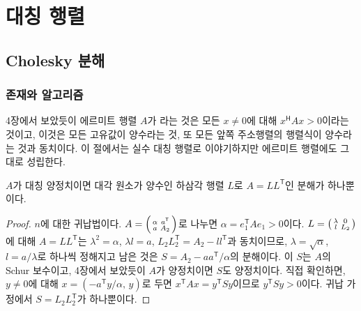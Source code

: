 \chapter{대칭 행렬}
\label{ch:symmetric}


\section{Cholesky 분해}
\label{sec:cholesky}

\subsection{존재와 알고리즘}

4장에서 보았듯이 에르미트 행렬 $A$가 라는 것은 모든 $x\ne0$에 대해 $x^{\mathsf H}Ax>0$이라는 것이고, 이것은 모든 고유값이 양수라는 것, 또 모든 앞쪽 주소행렬의 행렬식이 양수라는 것과 동치이다. 이 절에서는 실수 대칭 행렬로 이야기하지만 에르미트 행렬에도 그대로 성립한다.

\begin{theorem}
\label{thm:cholesky}
$A$가 대칭 양정치이면 대각 원소가 양수인 하삼각 행렬 $L$로 $A=LL^{\mathsf T}$인 분해가 하나뿐이다.
\end{theorem}

\begin{proof}
$n$에 대한 귀납법이다. $A=\begin{psmallmatrix}\alpha&a^{\mathsf T}\\a&A_2\end{psmallmatrix}$로 나누면 $\alpha=e_1^{\mathsf T}Ae_1>0$이다. $L=\begin{psmallmatrix}\lambda&0\\l&L_2\end{psmallmatrix}$에 대해 $A=LL^{\mathsf T}$는 $\lambda^2=\alpha$, $\lambda l=a$, $L_2L_2^{\mathsf T}=A_2-ll^{\mathsf T}$과 동치이므로, $\lambda=\sqrt\alpha$, $l=a/\lambda$로 하나씩 정해지고 남은 것은 $S=A_2-aa^{\mathsf T}/\alpha$의 분해이다. 이 $S$는 $A$의 Schur 보수이고, 4장에서 보았듯이 $A$가 양정치이면 $S$도 양정치이다. 직접 확인하면, $y\ne0$에 대해 $x=(-a^{\mathsf T}y/\alpha,\,y)$로 두면 $x^{\mathsf T}Ax=y^{\mathsf T}Sy$이므로 $y^{\mathsf T}Sy>0$이다. 귀납 가정에서 $S=L_2L_2^{\mathsf T}$가 하나뿐이다.
\end{proof}

